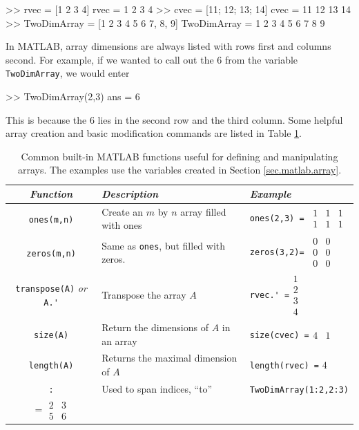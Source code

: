 \begin{codex}
>> rvec = [1 2 3 4]
rvec =
    1   2   3   4
>> cvec = [11; 12; 13; 14]
cvec =
    11
    12
    13
    14
>> TwoDimArray = [1 2 3
4 5 6
7, 8, 9]
TwoDimArray =
    1   2   3
    4   5   6
    7   8   9
\end{codex}

\par
In MATLAB, array dimensions are always listed with rows first and columns second.  For example, if we wanted to call out the 6 from the variable \verb=TwoDimArray=, we would enter

\begin{codex}
>> TwoDimArray(2,3)
ans =
    6
\end{codex}
This is because the 6 lies in the second row and the third column.  Some helpful array creation and basic modification commands are listed in Table \ref{tab.arraycreate}.
\begin{table}[bht]
\centering
\renewcommand{\arraystretch}{1.2}
\begin{tabular}{c|p{1.65in}|p{}}
    \textit{Function}   &\parbox{1.5in}{\centering\textit{Description}}& \parbox{.3\textwidth}{\centering\textit{Example}} \\ \hline \hline
    \verb=ones(m,n)=    & Create an $m$ by $n$ array filled with ones &
        \verb#ones(2,3) = #$\begin{array}{ccc} 1&1&1\\1&1&1\end{array}$ \\
    \verb=zeros(m,n)=   & Same as \verb=ones=, but filled with zeros. &
        \verb#zeros(3,2)= #$\begin{array}{cc} 0&0\\0&0\\0&0\end{array}$ \\
    \verb=transpose(A)= \textit{or} \verb=A.'= & Transpose the array $A$ &
        \verb#rvec.' =#$\begin{array}{c}1\\2\\3\\4\end{array}$ \\
    \verb=size(A)=      & Return the dimensions of $A$ in an array &
        \verb#size(cvec) =#$\begin{array}{cc}4&1\end{array}$\\
    \verb=length(A)=    & Returns the maximal dimension of $A$ &
        \verb#length(rvec) =# $4$\\
    \verb=:=            & Used to span indices, ``to'' &
        \raggedright \verb#TwoDimArray(1:2,2:3)#\\ \hfill $=\begin{array}{cc}2&3\\5&6\end{array}$
\end{tabular}
\caption[Common Basic Array Functions]{\footnotesize
        Common built-in MATLAB functions useful for defining and manipulating arrays.  The examples use the variables created in Section \ref{sec.matlab.array}.
        \label{tab.arraycreate}
        }
\end{table}
